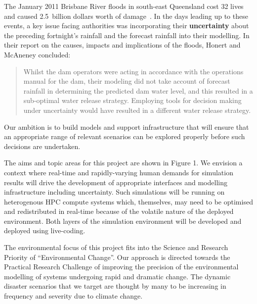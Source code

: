 The January 2011 Brisbane River floods in south-east Queensland cost
32 lives and caused 2.5~billion dollars worth of
damage~\parencite{vandenhonert2011}. In the days leading up to these
events, a key issue facing authorities was incorporating their
\textbf{uncertainty} about the preceding fortnight's rainfall and the
forecast rainfall into their modelling. In their report on the causes,
impacts and implications of the floods,  Honert and McAneney \cite{vandenhonert2011}
concluded:
\blockquote{Whilst the dam operators were acting in accordance with the operations manual for the dam, their modeling did not take account of forecast rainfall in determining the predicted dam water level, and this resulted in a sub-optimal water release strategy. Employing tools for decision making under uncertainty would have resulted in a different water release strategy.}

Our ambition is to build models 
and support infrastructure that will ensure that an appropriate range of relevant scenarios
can be explored properly before such decisions are undertaken.

The aims and topic areas for this project are
shown in Figure 1. We envision a context where real-time and rapidly-varying human demands for 
simulation results will drive the development of appropriate interfaces and modelling infrastructure including uncertainty. 
Such simulations will be running on heterogenous HPC compute systems which, themselves, may need to be optimised and redistributed in real-time because of the volatile nature of the deployed environment. Both layers of the simulation environment will be developed and deployed using live-coding.  

The environmental focus of this project fits into the Science and Research Priority of ``Environmental Change''. Our approach is directed towards the Practical Research Challenge of improving the precision of the environmental modelling of systems undergoing rapid and dramatic change. The dynamic disaster scenarios that we target are thought by many to be increasing in frequency and severity due to climate change.\\
 
